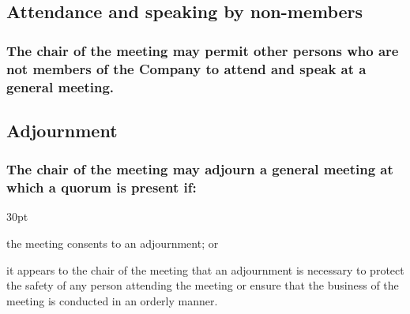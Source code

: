 \documentclass[12pt]{article}
\newcommand*{\fancyref}[1]{\hyperref[{#1}]{\autoref*{#1} (\nameref*{#1})}}
\def\clauseindent{30pt}
\newenvironment{subindentpara}{\raggedright\begin{adjustwidth}{\clauseindent}{}\begin{hanginglist}}{\end{hanginglist}\end{adjustwidth}}
\begin{document}

\subsection{Attendance and speaking by non-members}
\subsubsection[Meeting chair may authorise any person to speak at a meeting]{The chair of the meeting may permit other persons who are not members of the Company to attend and speak at a general meeting.}

\subsection{Adjournment}
\subsubsection[Adjournment of general meetings with quorum]{The chair of the meeting may adjourn a general meeting at which a quorum is present if:}
\begin{subindentpara}
    \item the meeting consents to an adjournment; or
    \item it appears to the chair of the meeting that an adjournment is necessary to protect the safety of any person attending the meeting or ensure that the business of the meeting is conducted in an orderly manner.
\end{subindentpara}
\end{document}
